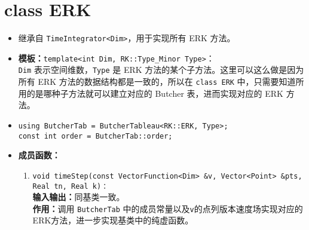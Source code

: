\documentclass[a4paper,twoside]{ctexart}
\begin{document}
\section{class ERK}
\begin{itemize}
    \item 继承自 \texttt{TimeIntegrator<Dim>}，用于实现所有 ERK 方法。
    \item \textbf{模板：}\texttt{template<int Dim, RK::Type\_Minor Type>}：\\\texttt{Dim} 表示空间维数，\texttt{Type} 是 ERK 方法的某个子方法。这里可以这么做是因为所有 ERK 方法的数据结构都是一致的，所以在 \texttt{class ERK} 中，只需要知道所用的是哪种子方法就可以建立对应的 Butcher 表，进而实现对应的 ERK 方法。
    \item \texttt{using ButcherTab = ButcherTableau<RK::ERK, Type>;\\
    const int order = ButcherTab::order;}
    \item \textbf{成员函数：}
            \begin{enumerate}[(1)]
                \item \texttt{void timeStep(const VectorFunction<Dim> \&v, Vector<Point> \&pts, Real tn, Real k)：}\\
                \textbf{输入输出：}同基类一致。\\
                \textbf{作用：}调用 \texttt{ButcherTab} 中的成员常量以及\texttt{v}的点列版本速度场实现对应的ERK方法，进一步实现基类中的纯虚函数。
            \end{enumerate}
\end{itemize}
\end{document}

